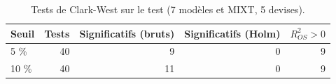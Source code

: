 \begin{table}[ht]
\centering
\small
\caption{Tests de Clark-West sur le test (7 modèles et MIXT, 5 devises).}
\label{tab:holm}
\begin{tabular}{lrrrr}
\toprule
Seuil & Tests & Significatifs (bruts) & Significatifs (Holm) & $R^2_{OS} > 0$ \\
\midrule
5 \% & 40 & 9 & 0 & 9 \\
10 \% & 40 & 11 & 0 & 9 \\
\bottomrule
\end{tabular}
\end{table}
